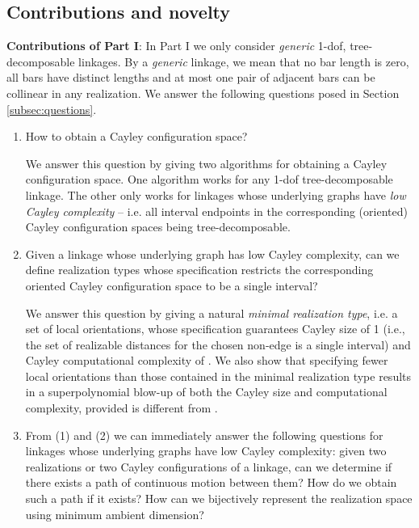 \documentclass[secthm,amsthm,english]{article}
\theoremstyle{definition}
\theoremstyle{remark}
\begin{document}
\subsection{Contributions and novelty}
\label{sub:contributions}


\noindent\textbf{Contributions of Part I}:  
In Part I we only consider \emph{generic} 1-dof, tree-decomposable linkages. 
By a \emph{generic} linkage, we mean that no bar length is zero, all bars have distinct lengths and 
at most one pair of adjacent bars can be collinear in any realization. 
We answer the following questions posed in Section \ref{subsec:questions}. 


\begin{enumerate}[(1)]

	\item How to obtain a Cayley configuration space?
	
	We answer this question by giving two algorithms for obtaining a Cayley configuration space. 
	One algorithm works for any 1-dof tree-decomposable linkage. 
	The other only works for linkages whose underlying graphs have \emph{low Cayley complexity} -- 
	i.e. all interval endpoints in the corresponding (oriented) Cayley configuration spaces being tree-decomposable.

	\item Given a linkage whose underlying graph has low Cayley complexity, 
	can we define realization types whose specification
	restricts the corresponding oriented Cayley configuration space to be a single interval?

	We answer this question by giving a natural \emph{minimal realization type}, i.e. a set of local orientations, whose specification guarantees Cayley size of 1 (i.e., the set of realizable distances for the chosen non-edge is a single interval) 
	and  Cayley computational complexity of .
	We also show that specifying fewer local orientations than those contained in the minimal realization type results in a
	superpolynomial blow-up of  both the Cayley size and computational complexity, provided  is different
	from .

	\item From (1) and (2) we can
	immediately answer the following questions for linkages whose underlying graphs have low Cayley complexity:	
	given two realizations or two Cayley configurations of a linkage, can we determine if there exists a path of continuous motion between them? How do we obtain such a path if it exists? 
	How can we bijectively represent the realization space using minimum ambient dimension?
	

\end{enumerate}
\end{document}
